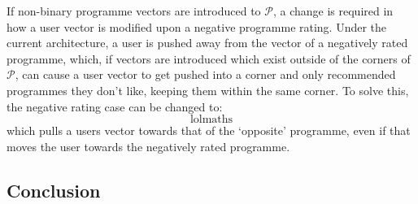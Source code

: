 		If non-binary programme vectors are introduced to $\mathcal{P}$, a change is required in how a user vector is modified upon a negative programme rating. Under the current architecture, a user is pushed away from the vector of a negatively rated programme, which, if vectors are introduced which exist outside of the corners of $\mathcal{P}$, can cause a user vector to get pushed into a corner and only recommended programmes they don't like, keeping them within the same corner. To solve this, the negative rating case can be changed to:
		$$
			\text{lolmaths}
		$$
		which pulls a users vector towards that of the `opposite' programme, even if that moves the user towards the negatively rated programme.

	\subsection{Conclusion}
